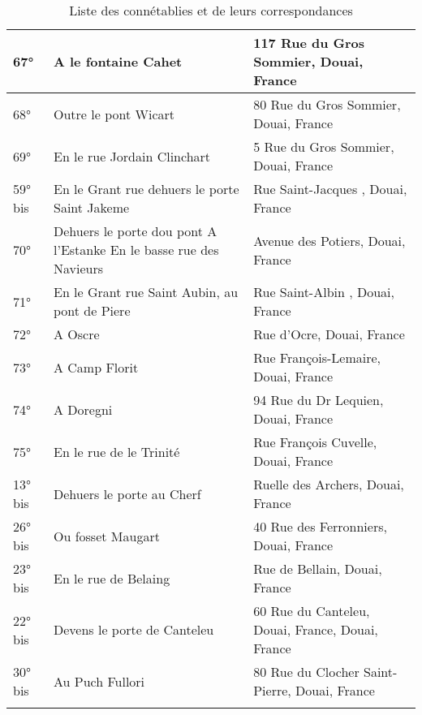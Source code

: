 \begin{center}
\begin{longtable}{|l|p{6.5cm}|p{6.5cm}|}
\hline	67°	&	A le fontaine Cahet	&	117 Rue du Gros Sommier, Douai, France	\\
\hline	68°	&	Outre le pont Wicart	&	80 Rue du Gros Sommier, Douai, France	\\
\hline	69°	&	En le rue Jordain Clinchart	&	5 Rue du Gros Sommier, Douai, France	\\
\hline	59° bis	&	En le Grant rue dehuers le porte Saint Jakeme	&	 Rue Saint-Jacques , Douai, France	\\
\hline	70°	&	Dehuers le porte dou pont A l'Estanke En le basse rue des Navieurs	&	 Avenue des Potiers, Douai, France	\\
\hline	71°	&	En le Grant rue Saint Aubin, au pont de Piere	&	Rue Saint-Albin , Douai, France	\\
\hline	72°	&	A Oscre	&	 Rue d'Ocre, Douai, France	\\
\hline	73°	&	A Camp Florit	&	Rue François-Lemaire, Douai, France	\\
\hline	74°	&	A Doregni	&	94 Rue du Dr Lequien, Douai, France	\\
\hline	75°	&	En le rue de le Trinité	&	 Rue François Cuvelle, Douai, France	\\
\hline	13° bis	&	Dehuers le porte au Cherf	&	 Ruelle des Archers, Douai, France	\\
\hline	26° bis	&	Ou fosset Maugart	&	 40 Rue des Ferronniers, Douai, France	\\
\hline	23° bis	&	En le rue de Belaing	&	 Rue de Bellain, Douai, France	\\
\hline	22° bis	&	Devens le porte de Canteleu	&	  60 Rue du Canteleu, Douai, France, Douai, France	\\
\hline	30° bis	&	Au Puch Fullori	&	80 Rue du Clocher Saint-Pierre, Douai, France	\\
\hline

    \caption{Liste des connétablies et de leurs correspondances }
    \label{connetablie_corresp}
    \end{longtable}
\end{center}
\normalsize